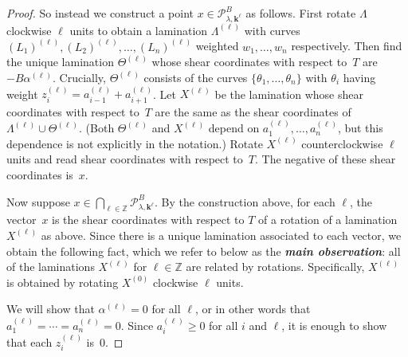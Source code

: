 \documentclass[10pt]{article}
\theoremstyle{definition}
\theoremstyle{remark}
\numberwithin{equation}{section}
\newcommand{\newword}[1]{\textbf{\emph{#1}}}
\newcommand{\integers}{\mathbb Z}
\newcommand{\set}[1]{{\lbrace #1 \rbrace}}
\newcommand{\0}{{\mathbf{0}}}
\newcommand{\kk}{{\boldsymbol{k}}}
\renewcommand{\P}{\mathcal{P}}
\begin{document}
\begin{proof}
So instead we construct a point $x\in \P^B_{\lambda,\kk^\ell}$ as follows.
First rotate $\Lambda$ clockwise $\ell$ units to obtain a lamination $\Lambda^{(\ell)}$
with curves $(L_1)^{(\ell)},(L_2)^{(\ell)},\ldots,(L_n)^{(\ell)}$ weighted $w_1,\ldots,w_n$ respectively.
Then find the unique lamination $\Theta^{(\ell)}$ whose shear coordinates with respect to~$T$ are~$-B\alpha^{(\ell)}$.
Crucially, $\Theta^{(\ell)}$ consists of the curves $\set{\theta_1,\ldots,\theta_n}$ with $\theta_i$ having weight $z_i^{(\ell)}=a_{i-1}^{(\ell)}+a_{i+1}^{(\ell)}$. 
Let $X^{(\ell)}$ be the lamination whose shear coordinates with respect to~$T$ are the same as the shear coordinates of $\Lambda^{(\ell)}\cup\Theta^{(\ell)}$.
(Both $\Theta^{(\ell)}$ and $X^{(\ell)}$ depend on $a_1^{(\ell)},\ldots,a_n^{(\ell)}$, but this dependence is not explicitly in the notation.)
Rotate $X^{(\ell)}$ counterclockwise $\ell$ units and read shear coordinates with respect to~$T$.
The negative of these shear coordinates is~$x$.

Now suppose $x\in\bigcap_{\ell\in\integers}\P^B_{\lambda,\kk^\ell}$.
By the construction above, for each $\ell$, the vector~$x$ is the shear coordinates with respect to $T$ of a rotation of a lamination $X^{(\ell)}$ as above.
Since there is a unique lamination associated to each vector, we obtain the following fact, which we refer to below as the \newword{main observation}:  all of the laminations $X^{(\ell)}$ for $\ell\in\integers$ are related by rotations.
Specifically, $X^{(\ell)}$ is obtained by rotating $X^{(0)}$ clockwise $\ell$ units.

We will show that $\alpha^{(\ell)}=0$ for all $\ell$, or in other words that $a_1^{(\ell)}=\cdots=a_n^{(\ell)}=0$.
Since $a_i^{(\ell)}\ge 0$ for all $i$ and $\ell$, it is enough to show that each $z_i^{(\ell)}$ is~$0$.


\end{proof}
\end{document}
